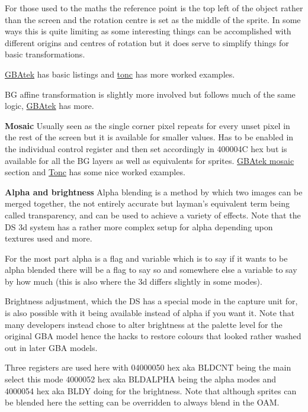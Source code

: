 \documentclass[
]{book}
\begin{document}
For those used to the maths the reference point is the top left of the object rather than the screen and the rotation centre is set as the middle of the sprite. In some ways this is quite limiting as some interesting things can be accomplished with different origins and centres of rotation but it does serve to simplify things for basic transformations.

\href{http://problemkaputt.de/gbatek.htm\#lcdobjoamattributes}{GBAtek} has basic listings and \href{http://www.coranac.com/tonc/text/affobj.htm}{tonc} has more worked examples.

BG affine transformation is slightly more involved but follows much of the same logic, \href{http://problemkaputt.de/gbatek.htm\#lcdiobgrotationscaling}{GBAtek} has more.

\textbf{Mosaic} Usually seen as the single corner pixel repeats for every unset pixel in the rest of the screen but it is available for smaller values. Has to be enabled in the individual control register and then set accordingly in 400004C hex but is available for all the BG layers as well as equivalents for sprites. \href{http://problemkaputt.de/gbatek.htm\#lcdiomosaicfunction}{GBAtek mosaic} section and \href{http://www.coranac.com/tonc/text/gfx.htm\#sec-blend}{Tonc} has some nice worked examples.

\textbf{Alpha and brightness} Alpha blending is a method by which two images can be merged together, the not entirely accurate but layman's equivalent term being called transparency, and can be used to achieve a variety of effects. Note that the DS 3d system has a rather more complex setup for alpha depending upon textures used and more.

For the most part alpha is a flag and variable which is to say if it wants to be alpha blended there will be a flag to say so and somewhere else a variable to say by how much (this is also where the 3d differs slightly in some modes).

Brightness adjustment, which the DS has a special mode in the capture unit for, is also possible with it being available instead of alpha if you want it. Note that many developers instead chose to alter brightness at the palette level for the original GBA model hence the hacks to restore colours that looked rather washed out in later GBA models.

Three registers are used here with 04000050 hex aka BLDCNT being the main select this mode 4000052 hex aka BLDALPHA being the alpha modes and 4000054 hex aka BLDY doing for the brightness. Note that although sprites can be blended here the setting can be overridden to always blend in the OAM.
\end{document}
